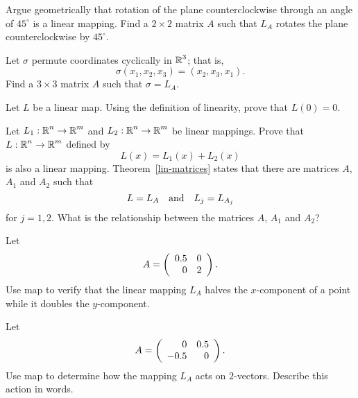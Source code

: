 \documentclass{ximera}
\begin{document}
\begin{exercise} \label{c4.3.9}
Argue geometrically that rotation of the plane counterclockwise
through an angle of $45^\circ$ is a linear mapping.  Find a
$2\times 2$ matrix $A$ such that $L_A$ rotates the plane
counterclockwise by $45^\circ$.
\end{exercise}

\begin{exercise} \label{c4.3.10}
Let $\sigma$ permute coordinates cyclically in $\mbox{$\Bbb{R}$}^3$; that is,
\[
\sigma(x_1,x_2,x_3) = (x_2,x_3,x_1).
\]
Find a $3\times 3$ matrix $A$ such that $\sigma = L_A$.
\end{exercise}

\begin{exercise} \label{c4.3.11}
Let $L$ be a linear map.  Using the definition of linearity,
prove that $L(0)=0$.
\end{exercise}

\begin{exercise}  \label{c4.3.12}
Let $L_1:\mbox{$\Bbb{R}$}^n\to\mbox{$\Bbb{R}$}^m$ and $L_2:\mbox{$\Bbb{R}$}^n\to\mbox{$\Bbb{R}$}^m$ be linear mappings. Prove
that $L:\mbox{$\Bbb{R}$}^n\to\mbox{$\Bbb{R}$}^m$ defined by
\[
L(x) = L_1(x) + L_2(x)
\]
is also a linear mapping.  Theorem~\ref{lin-matrices} states that there
are matrices $A$, $A_1$ and $A_2$ such that
\[
L = L_A \quad\mbox{and}\quad L_j = L_{A_j}
\]
for $j=1,2$.  What is the relationship between the matrices $A$, $A_1$
and $A_2$?
\end{exercise}

\CEXER

\begin{exercise} \label{c4.3.13}
Let
\[
A = \left(\begin{array}{rr} 0.5 & 0\\ 0 &2\end{array}\right).
\]
Use {\sf map} to verify that the linear mapping $L_A$ halves
the $x$-component of a point while it doubles the $y$-component.
\end{exercise}

\begin{exercise} \label{c4.3.14}
Let
\[
A = \left(\begin{array}{rr} 0 & 0.5\\ -0.5 &0\end{array}\right).
\]
Use {\sf map} to determine how the mapping $L_A$ acts on $2$-vectors.
Describe this action in words.
\end{exercise}
\end{document}
